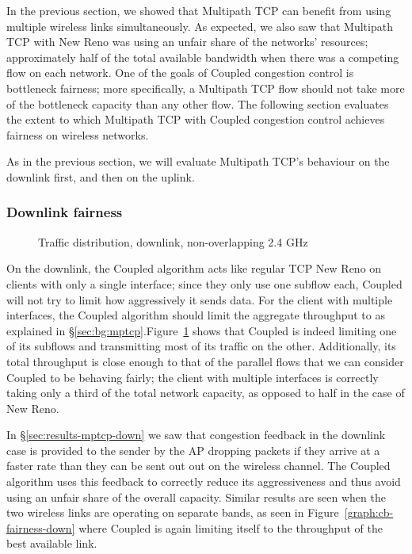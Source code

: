 In the previous section, we showed that Multipath TCP can benefit from using
multiple wireless links simultaneously. As expected, we also saw that Multipath
TCP with New Reno was using an unfair share of the networks' resources;
approximately half of the total available bandwidth when there was a competing
flow on each network. One of the goals of Coupled congestion control is
bottleneck fairness; more specifically, a Multipath TCP flow should not take
more of the bottleneck capacity than any other flow. The following section
evaluates the extent to which Multipath TCP with Coupled congestion control
achieves fairness on wireless networks.

As in the previous section, we will evaluate Multipath TCP's behaviour on the
downlink first, and then on the uplink.

\subsubsection{Downlink fairness}

\begin{figure}[h]
 \centering
 
 \caption{Traffic distribution, downlink, non-overlapping 2.4 GHz}\label{graph:down-fair}
\end{figure}

On the downlink, the Coupled algorithm acts like regular TCP New Reno on clients
with only a single interface; since they only use one subflow each, Coupled will
not try to limit how aggressively it sends data. For the client with multiple
interfaces, the Coupled algorithm should limit the aggregate throughput to as
explained in \S\ref{sec:bg:mptcp}.\@ Figure~\ref{graph:down-fair} shows that
Coupled is indeed limiting one of its subflows and transmitting most of its
traffic on the other. Additionally, its total throughput is close enough to that
of the parallel flows that we can consider Coupled to be behaving fairly; the
client with multiple interfaces is correctly taking only a third of the total
network capacity, as opposed to half in the case of New Reno.

In \S\ref{sec:results-mptcp-down} we saw that congestion feedback in the
downlink case is provided to the sender by the AP dropping packets if they
arrive at a faster rate than they can be sent out out on the wireless channel.
The Coupled algorithm uses this feedback to correctly reduce its aggressiveness
and thus avoid using an unfair share of the overall capacity. Similar results
are seen when the two wireless links are operating on separate bands, as seen in
Figure~\ref{graph:cb-fairness-down} where Coupled is again limiting itself to
the throughput of the best available link.


